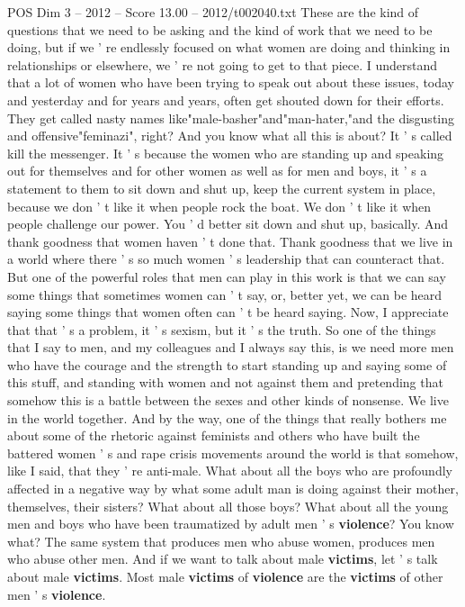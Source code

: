 \begin{textsample}{POS Dim 3 – 2012 – Score 13.00 – 2012/t002040.txt}
These are the kind of questions that we need to be asking and the kind of work that we need to be doing, but if we ' re endlessly focused on what women are doing and thinking in relationships or elsewhere, we ' re not going to get to that piece.
I understand that a lot of women who have been trying to speak out about these issues, today and yesterday and for years and years, often get shouted down for their efforts.
They get called nasty names like"male-basher"and"man-hater,"and the disgusting and offensive"feminazi", right?
And you know what all this is about?
It ' s called kill the messenger.
It ' s because the women who are standing up and speaking out for themselves and for other women as well as for men and boys, it ' s a statement to them to sit down and shut up, keep the current system in place, because we don ' t like it when people rock the boat.
We don ' t like it when people challenge our power.
You ' d better sit down and shut up, basically.
And thank goodness that women haven ' t done that.
Thank goodness that we live in a world where there ' s so much women ' s leadership that can counteract that.
But one of the powerful roles that men can play in this work is that we can say some things that sometimes women can ' t say, or, better yet, we can be heard saying some things that women often can ' t be heard saying.
Now, I appreciate that that ' s a problem, it ' s sexism, but it ' s the truth.
So one of the things that I say to men, and my colleagues and I always say this, is we need more men who have the courage and the strength to start standing up and saying some of this stuff, and standing with women and not against them and pretending that somehow this is a battle between the sexes and other kinds of nonsense.
We live in the world together.
And by the way, one of the things that really bothers me about some of the rhetoric against feminists and others who have built the battered women ' s and rape crisis movements around the world is that somehow, like I said, that they ' re anti-male.
What about all the boys who are profoundly affected in a negative way by what some adult man is doing against their mother, themselves, their sisters?
What about all those boys?
What about all the young men and boys who have been traumatized by adult men ' s \textbf{violence}?
You know what?
The same system that produces men who abuse women, produces men who abuse other men.
And if we want to talk about male \textbf{victims}, let ' s talk about male \textbf{victims}.
Most male \textbf{victims} of \textbf{violence} are the \textbf{victims} of other men ' s \textbf{violence}.

\end{textsample}

